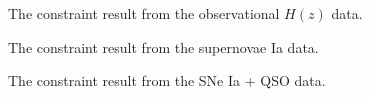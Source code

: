 \documentclass[twocolumn]{aastex631}
\begin{document}
   \begin{figure}[htbp]
      \centering
      \caption{The constraint result from the observational
      $H(z)$ data.}
   \end{figure}

   \begin{figure}[htbp]
      \centering
      \caption{The constraint result from the supernovae
      Ia data.}
   \end{figure}

   \begin{figure}[htbp]
      \centering
      \caption{The constraint result from the SNe Ia + QSO data.}
   \end{figure}
\end{document}
